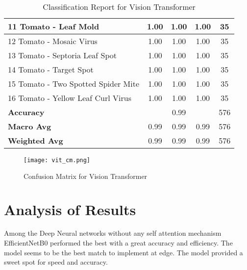 \begin{table}[h!]
{\begin{tabular}{|l|c|c|c|c|}
    11 Tomato - Leaf Mold                             & 1.00               & 1.00            & 1.00              & 35               \\ \hline
    12 Tomato - Mosaic Virus                          & 1.00               & 1.00            & 1.00              & 35               \\ \hline
    13 Tomato - Septoria Leaf Spot                    & 1.00               & 1.00            & 1.00              & 35               \\ \hline
    14 Tomato - Target Spot                           & 1.00               & 1.00            & 1.00              & 35               \\ \hline
    15 Tomato - Two Spotted Spider Mite               & 1.00               & 1.00            & 1.00              & 35               \\ \hline
    16 Tomato - Yellow Leaf Curl Virus                & 1.00               & 1.00            & 1.00              & 35               \\ \hline
    \textbf{Accuracy}                                 & \multicolumn{3}{c|}{0.99}            & 576              \\ \hline
    \textbf{Macro Avg}                                & 0.99               & 0.99            & 0.99              & 576              \\ \hline
    \textbf{Weighted Avg}                             & 0.99               & 0.99            & 0.99              & 576              \\ \hline
    \end{tabular}%
    }
    \caption{Classification Report for Vision Transformer}
    \label{tab:classification_report}
\end{table}

\begin{figure}[h!]
    \centering
    \texttt{[image: vit\_cm.png]}
    \caption{Confusion Matrix for Vision Transformer}
    \label{fig:vit_cm}
\end{figure}


\section{ Analysis of Results}

Among the Deep Neural networks without any self attention mechanism EfficientNetB0 performed the best with a great accuracy and efficiency. The model seems to be the best match to implement at edge. The model provided a sweet spot for speed and accuracy.

